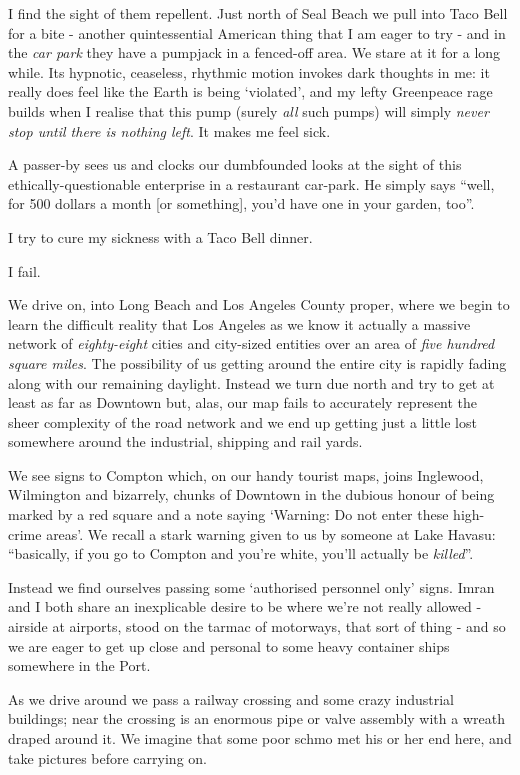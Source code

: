 \documentclass[a5paper,titlepage,11pt]{book}
\begin{document}
I find the sight of them repellent. Just north of Seal Beach we pull into Taco Bell for a bite - another quintessential American thing that I am eager to try - and in the \emph{car park} they have a pumpjack in a fenced-off area. We stare at it for a long while. Its hypnotic, ceaseless, rhythmic motion invokes dark thoughts in me: it really does feel like the Earth is being `violated', and my lefty Greenpeace rage builds when I realise that this pump (surely \emph{all} such pumps) will simply \emph{never stop until there is nothing left}. It makes me feel sick.

A passer-by sees us and clocks our dumbfounded looks at the sight of this ethically-questionable enterprise in a restaurant car-park. He simply says ``well, for 500 dollars a month {\footnotesize [or something]}, you'd have one in your garden, too''.

I try to cure my sickness with a Taco Bell dinner.

I fail.

We drive on, into Long Beach and Los Angeles County proper, where we begin to learn the difficult reality that Los Angeles as we know it actually a massive network of \emph{eighty-eight} cities and city-sized entities over an area of \emph{five hundred square miles}. The possibility of us getting around the entire city is rapidly fading along with our remaining daylight. Instead we turn due north and try to get at least as far as Downtown but, alas, our map fails to accurately represent the sheer complexity of the road network and we end up getting just a little lost somewhere around the industrial, shipping and rail yards.

We see signs to Compton which, on our handy tourist maps, joins Inglewood, Wilmington and bizarrely, chunks of Downtown in the dubious honour of being marked by a red square and a note saying `Warning: Do not enter these high-crime areas'. We recall a stark warning given to us by someone at Lake Havasu:  ``basically, if you go to Compton and you're white, you'll actually be \emph{killed}''.

Instead we find ourselves passing some `authorised personnel only' signs. Imran and I both share an inexplicable desire to be where we're not really allowed - airside at airports, stood on the tarmac of motorways, that sort of thing - and so we are eager to get up close and personal to some heavy container ships somewhere in the Port.

As we drive around we pass a railway crossing and some crazy industrial buildings; near the crossing is an enormous pipe or valve assembly with a wreath draped around it. We imagine that some poor schmo met his or her end here, and take pictures before carrying on.
\end{document}
